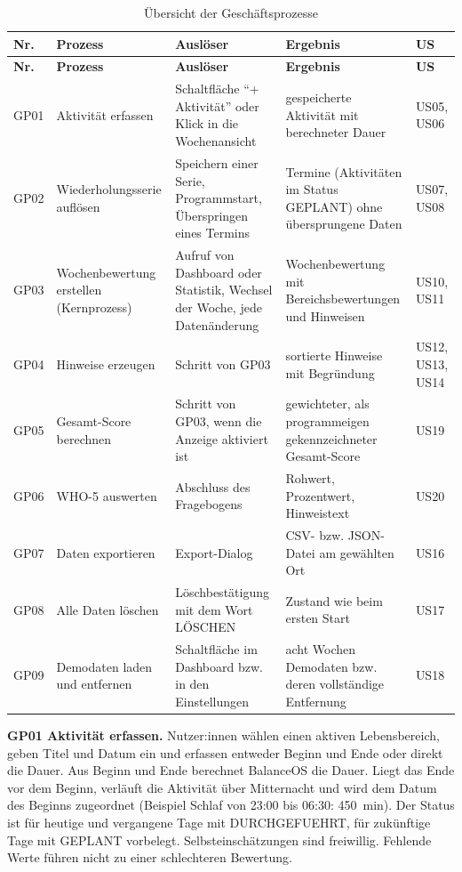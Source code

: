 \begin{longtable}{@{}L{1.0cm}L{3.1cm}L{4.2cm}L{4.9cm}L{1.6cm}@{}}
  \caption{Übersicht der Geschäftsprozesse}\label{tab:prozesse}\\
  \toprule
  \textbf{Nr.} & \textbf{Prozess} & \textbf{Auslöser} & \textbf{Ergebnis} & \textbf{US} \\
  \midrule
  \endfirsthead
  \toprule
  \textbf{Nr.} & \textbf{Prozess} & \textbf{Auslöser} & \textbf{Ergebnis} & \textbf{US} \\
  \midrule
  \endhead
  \bottomrule
  \endfoot
  GP01 & Aktivität erfassen & Schaltfläche \enquote{+ Aktivität} oder Klick in die Wochenansicht & gespeicherte Aktivität mit berechneter Dauer & US05, US06 \\
  GP02 & Wiederholungs\-serie auflösen & Speichern einer Serie, Programmstart, Überspringen eines Termins & Termine (Aktivitäten im Status GEPLANT) ohne übersprungene Daten & US07, US08 \\
  GP03 & Wochenbewertung erstellen (Kernprozess) & Aufruf von Dashboard oder Statistik, Wechsel der Woche, jede Datenänderung & Wochenbewertung mit Bereichsbewertungen und Hinweisen & US10, US11 \\
  GP04 & Hinweise erzeugen & Schritt von GP03 & sortierte Hinweise mit Begründung & US12, US13, US14 \\
  GP05 & Gesamt-Score berechnen & Schritt von GP03, wenn die Anzeige aktiviert ist & gewichteter, als programmeigen gekennzeichneter Gesamt-Score & US19 \\
  GP06 & WHO-5 auswerten & Abschluss des Fragebogens & Rohwert, Prozentwert, Hinweistext & US20 \\
  GP07 & Daten exportieren & Export-Dialog & CSV- bzw. JSON-Datei am gewählten Ort & US16 \\
  GP08 & Alle Daten löschen & Löschbestätigung mit dem Wort LÖSCHEN & Zustand wie beim ersten Start & US17 \\
  GP09 & Demodaten laden und entfernen & Schaltfläche im Dashboard bzw. in den Einstellungen & acht Wochen Demodaten bzw. deren vollständige Entfernung & US18 \\
\end{longtable}

\textbf{GP01 Aktivität erfassen.} Nutzer:innen wählen einen aktiven Lebensbereich, geben Titel und Datum ein und erfassen entweder Beginn und Ende oder direkt die Dauer. Aus Beginn und Ende berechnet BalanceOS die Dauer. Liegt das Ende vor dem Beginn, verläuft die Aktivität über Mitternacht und wird dem Datum des Beginns zugeordnet (Beispiel Schlaf von 23:00 bis 06:30: 450~min). Der Status ist für heutige und vergangene Tage mit DURCHGEFUEHRT, für zukünftige Tage mit GEPLANT vorbelegt. Selbsteinschätzungen sind freiwillig. Fehlende Werte führen nicht zu einer schlechteren Bewertung.

